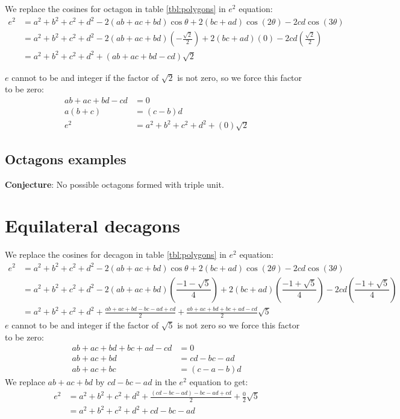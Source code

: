 \documentclass[11pt]{article}
\begin{document}
We replace the cosines for octagon in table \ref{tbl:polygons} in $e^2$ equation:
\begin{align}
e^2 &= a^2 +b^2 +c^2 +d^2 -2(ab+ac+bd)\cos\theta +2(bc+ad)\cos(2\theta) -2cd\cos(3\theta) \nonumber\\
 &= a^2 +b^2 +c^2 +d^2 
 -2(ab+ac+bd)\left(-\frac{\sqrt{2}}{2}\right) 
 +2(bc+ad)\left(0\right) 
 -2cd\left(\frac{\sqrt{2}}{2}\right) \nonumber\\
 &= a^2 +b^2 +c^2 +d^2 +(ab +ac +bd -cd)\sqrt{2}
\end{align} 

$e$ cannot to be and integer if the factor of $\sqrt{2}$ is not zero, so we force this factor to be zero:
\begin{align*}
ab + ac + bd - cd &= 0 \\
a(b+c) &= (c-b)d \\
e^2 &= a^2 +b^2 +c^2 +d^2 + (0)\sqrt{2}
\end{align*}



\subsection{Octagons examples}

\textbf{Conjecture}: No possible octagons formed with triple unit.

\section{Equilateral decagons}

We replace the cosines for decagon in table \ref{tbl:polygons} in $e^2$ equation:
\begin{align}
e^2 &= a^2 +b^2 +c^2 +d^2 -2(ab+ac+bd)\cos\theta +2(bc+ad)\cos(2\theta) -2cd\cos(3\theta) \nonumber\\
 &= a^2 +b^2 +c^2 +d^2
  -2(ab+ac+bd)\left(\dfrac{-1-\sqrt{5}}{4}\right)
  +2(bc+ad)\left(\dfrac{-1+\sqrt{5}}{4}\right)
  -2cd\left(\dfrac{-1+\sqrt{5}}{4}\right) \nonumber\\
 &= a^2 +b^2 +c^2 +d^2 +\frac{ab+ac+bd -bc-ad +cd}{2} +\frac{ab+ac+bd +bc+ad -cd}{2}\sqrt{5}
\end{align}
$e$ cannot to be and integer if the factor of $\sqrt{5}$ is not zero so we force this factor to be zero:
\begin{align}
 ab+ac+bd +bc+ad -cd &= 0\nonumber\\
 ab+ac+bd &= cd -bc-ad \\
 ab+ac+bc &= (c -a -b)d
\end{align}
We replace $ab+ac+bd$ by $cd -bc-ad$ in the $e^2$ equation to get:
\begin{align}
e^2 &= a^2 +b^2 +c^2 +d^2 +\frac{(cd -bc-ad) -bc-ad+cd}{2} +\frac{0}{2}\sqrt{5} \nonumber\\
 &= a^2 +b^2 +c^2 +d^2 + cd -bc -ad\nonumber
\end{align}
\end{document}
